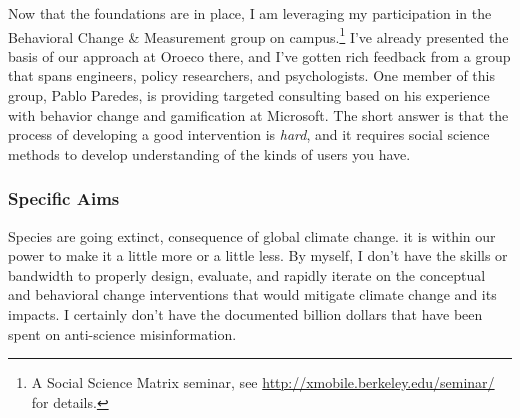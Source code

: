 Now that the foundations are in place, I am leveraging my participation in the
Behavioral Change \& Measurement group on campus.\footnote{A Social Science
    Matrix seminar, see \url{http://xmobile.berkeley.edu/seminar/} for details.}
I've already presented the basis of our approach at Oroeco there, and I've
gotten rich feedback from a group that spans engineers, policy researchers, and
psychologists. One member of this group, Pablo Paredes, is providing targeted
consulting based on his experience with behavior change and gamification at
Microsoft. The short answer is that the process of developing a good
intervention is \emph{hard}, and it requires social science methods to develop
understanding of the kinds of users you have.


\subsubsection{Specific Aims}

Species are going extinct, %
consequence of global climate change. %
it is within our power to make it a little more or a little less. By myself, I
don't have the skills or bandwidth to properly design, evaluate, and rapidly
iterate on the conceptual and behavioral change interventions that would
mitigate climate change and its impacts. I certainly don't have the documented
billion dollars that have been spent on anti-science misinformation.


